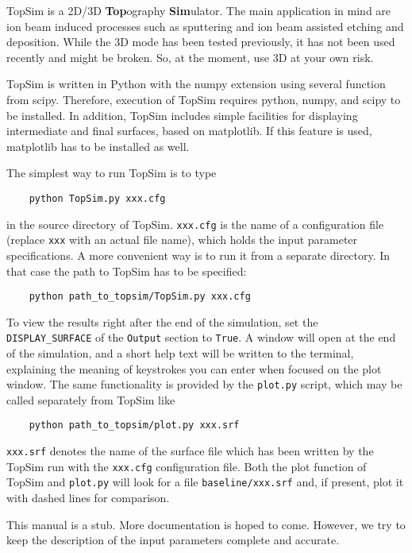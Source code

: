 TopSim is a 2D/3D \textbf{Top}ography \textbf{Sim}ulator. The main
application in mind are ion beam induced processes such as sputtering and ion beam assisted
etching and deposition. While the 3D mode has been tested previously, it
has not been used recently and might be broken. So, at the moment, use 3D at
your own risk.

TopSim is written in Python with the numpy extension using several
function from scipy. Therefore, execution of TopSim requires
python, numpy, and scipy to be installed. In addition, TopSim includes simple
facilities for displaying intermediate and final surfaces, based on matplotlib.
If this feature is used, matplotlib has to be installed as well.

The simplest way to run TopSim is to type
%
\begin{verbatim}
	python TopSim.py xxx.cfg
\end{verbatim}
%
in the source directory of TopSim. \texttt{xxx.cfg} is the name of a
configuration file (replace \texttt{xxx} with an actual file name), which holds
the input parameter specifications. A more convenient way is to run it from a
separate directory. In that case the path to TopSim has to be specified: 
%
\begin{verbatim}
	python path_to_topsim/TopSim.py xxx.cfg
\end{verbatim}
%
To view the results right after the end of the simulation, set the
\texttt{DISPLAY\_SURFACE} of the \texttt{Output} section to \texttt{True}. A
window will open at the end of the simulation, and a short help text will be
written to the terminal, explaining the meaning of keystrokes you can enter
when focused on the plot window. The same functionality is provided by the
\texttt{plot.py} script, which may be called separately from TopSim like
%
\begin{verbatim}
	python path_to_topsim/plot.py xxx.srf
\end{verbatim}
%
\texttt{xxx.srf} denotes the name of the surface file which has been written by
the TopSim run with the \texttt{xxx.cfg} configuration file. Both the plot
function of TopSim and \texttt{plot.py} will look for a file
\texttt{baseline/xxx.srf} and, if present, plot it with dashed lines for
comparison.

This manual is a stub. More documentation is hoped to come. However, we try to
keep the description of the input parameters complete and accurate.
